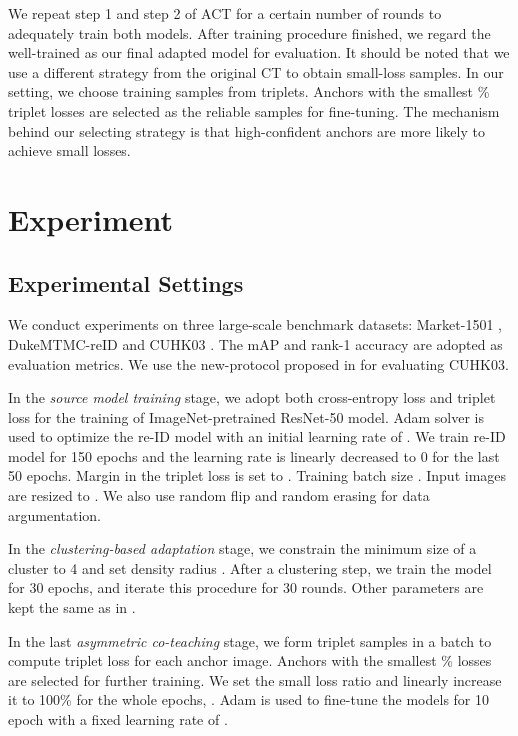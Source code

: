 \documentclass[letterpaper]{article} \usepackage{aaai20}  \usepackage{times}  \usepackage{helvet} \usepackage{courier}  \usepackage[hyphens]{url}  \usepackage{graphicx} \urlstyle{rm} \def\UrlFont{\rm}  \usepackage{graphicx}  \frenchspacing  \setlength{\pdfpagewidth}{8.5in}  \setlength{\pdfpageheight}{11in}  \usepackage{color}
\begin{document}
We repeat step 1 and step 2 of ACT for a certain number of rounds to adequately train both models. After training procedure finished, we regard the well-trained  as our final adapted model for evaluation. It should be noted that we use a different strategy from the original CT to obtain small-loss samples. In our setting, we choose training samples from triplets. Anchors with the smallest \% triplet losses are selected as the reliable samples for fine-tuning. The mechanism behind our selecting strategy is that high-confident anchors are more likely to achieve small losses.


\section{Experiment}
\label{sec:exp}

\subsection{Experimental Settings}
We conduct experiments on three large-scale benchmark datasets: Market-1501 \cite{zheng2015scalable}, DukeMTMC-reID \cite{ristani2016MTMC,zheng2017unlabeled} and CUHK03 \cite{CUHK03}. The mAP and rank-1 accuracy are adopted as evaluation metrics. We use the new-protocol proposed in \cite{zhong2017re} for evaluating CUHK03.

In the \textit{source model training} stage, we adopt both cross-entropy loss and triplet loss for the training of ImageNet-pretrained ResNet-50 model. Adam solver is used to optimize the re-ID model with an initial learning rate of . We train re-ID model for 150 epochs and the learning rate is linearly decreased to 0 for the last 50 epochs. Margin  in the triplet loss is set to . Training batch size . Input images are resized to . We also use random flip and random erasing \cite{RE} for data argumentation.

In the \textit{clustering-based adaptation} stage, we constrain the minimum size of a cluster to 4 and set density radius . After a clustering step, we train the model for 30 epochs, and iterate this procedure for 30 rounds. Other parameters are kept the same as in \cite{song2018unsupervised}.

In the last \textit{asymmetric co-teaching} stage, we form triplet samples in a batch to compute triplet loss for each anchor image. Anchors with the smallest \% losses are selected for further training.  We set the small loss ratio  and linearly increase it to 100\% for the whole  epochs, .
Adam is used to fine-tune the models for 10 epoch with a fixed learning rate of .
\end{document}
